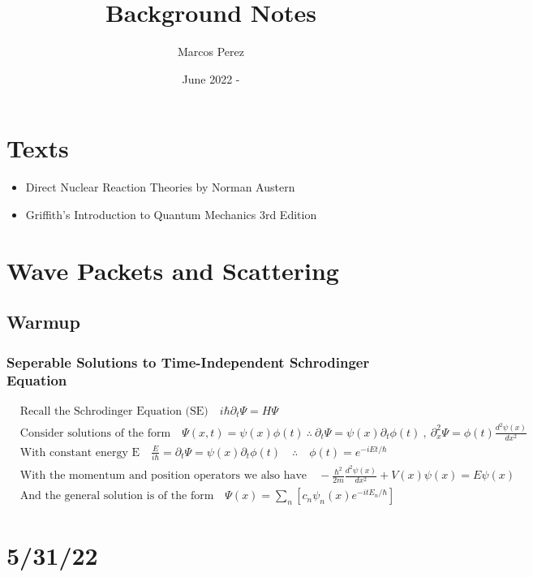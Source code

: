 \documentclass[12pt]{article}
\title{Background Notes}
\author{Marcos Perez}
\date{June 2022 - }
\begin{document}
\maketitle

\section{Texts}
\begin{itemize}
    \item Direct Nuclear Reaction Theories by Norman Austern
    \item Griffith's Introduction to Quantum Mechanics 3rd Edition
\end{itemize}

\section{Wave Packets and Scattering}
\subsection{Warmup}
\subsubsection{Seperable Solutions to Time-Independent Schrodinger Equation}
\begin{align}
&\text{Recall the Schrodinger Equation (SE)}\quad i\hbar\partial_t\Psi=H\Psi\\
&\text{Consider solutions of the form}\quad \Psi(x,t)=\psi(x)\phi(t)\ \therefore\ \partial_t\Psi=\psi(x)\partial_t\phi(t)\ ,\ 
\partial^2_x\Psi=\phi(t)\frac{d^2\psi(x)}{dx^2}\\
&\text{With constant energy E}\quad \frac{E}{i\hbar}=\partial_t\Psi=\psi(x)\partial_t\phi(t)\quad\therefore\quad \phi(t)=e^{-i Et/\hbar}\\
&\text{With the momentum and position operators we also have}\quad -\frac{\hbar^2}{2m}\frac{d^2\psi(x)}{dx^2}+V(x)\psi(x)=E\psi(x) \\
&\text{And the general solution is of the form}\quad \Psi(x)=\sum_n\left[c_n\psi_n(x)e^{-itE_n/\hbar}\right]
\end{align}



\section{5/31/22}
\end{document}

